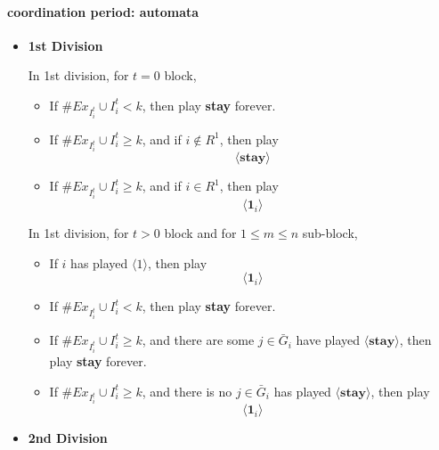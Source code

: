 \documentclass[12pt,letter]{article}
\theoremstyle{definition}
\theoremstyle{remark}
\theoremstyle{claim}
\begin{document}
\paragraph{coordination period: automata}


\begin{itemize}





\item \textbf{1st Division} 

In 1st division, for $t=0$ block,

\begin{itemize}



\item If $\# Ex_{I^{t}_i}\cup I^{t}_i<k$, then play \textbf{stay} forever.

\item If $\# Ex_{I^{t}_i}\cup I^{t}_i \geq k$, and if $i\not\in R^1$, then play
\[\langle \textbf{stay} \rangle\]

\item If $\# Ex_{I^{t}_i}\cup I^{t}_i \geq k$, and if $i\in R^1$, then play
\[\langle \mathbf{1}_i \rangle\]


\end{itemize}

In 1st division, for $t>0$ block and for $1\leq m \leq n$ sub-block,
\begin{itemize}

\item If $i$ has played $\langle 1 \rangle$, then play 
\[\langle \mathbf{1}_i \rangle\]

\item If $\# Ex_{I^{t}_i}\cup I^{t}_i<k$, then play \textbf{stay} forever.

\item If $\# Ex_{I^{t}_i}\cup I^{t}_i\geq k$, and there are some $j\in \bar{G}_i$ have played $\langle \textbf{stay} \rangle $, then play
\textbf{stay} forever.
\item If $\# Ex_{I^{t}_i}\cup I^{t}_i \geq k$, and there is no $j\in \bar{G}_i$ has played $\langle \textbf{stay} \rangle $, then play
\[\langle \mathbf{1}_i \rangle\]

\end{itemize}




\item \textbf{2nd Division} 


\end{itemize}
\end{document}
